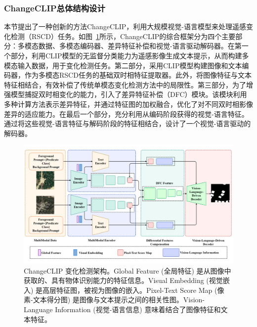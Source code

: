 \subsubsection{ChangeCLIP总体结构设计}
本节提出了一种创新的方法ChangeCLIP，利用大规模视觉-语言模型来处理遥感变化检测（RSCD）任务。如图~\ref{fig:changeclip3}所示，ChangeCLIP的综合框架分为四个主要部分：多模态数据、多模态编码器、差异特征补偿和视觉-语言驱动解码器。在第一个部分，利用CLIP模型的无监督分类能力为遥感影像生成文本提示，从而构建多模态输入数据，用于变化检测任务。第二部分，采用CLIP模型构建图像和文本编码器，作为多模态RSCD任务的基础双时相特征提取器。此外，将图像特征与文本特征相结合，有效补偿了传统单模态变化检测方法中的局限性。第三部分，为了增强模型捕捉双时相变化的能力，引入了差异特征补偿（DFC）模块。该模块利用多种计算方法表示差异特征，并通过特征图的加权融合，优化了对不同双时相影像差异的适应能力。在最后一个部分，充分利用从编码阶段获得的视觉-语言特征。通过将这些视觉-语言特征与解码阶段的特征相结合，设计了一个视觉-语言驱动的解码器。

\begin{figure}[!htbp]
  \centering
  \includegraphics[width=\textwidth]{paper_figures/基于AI基础模型微调的变化检测模型研究/ChangeCLIP/changeclip3.png}
  \caption{ChangeCLIP 变化检测架构。Global Feature (全局特征) 是从图像中获取的、具有物体识别能力的特征信息。Visual Embedding (视觉嵌入) 是高层特征图，被视为图像的嵌入。Pixel-Text Score Map (像素-文本得分图) 是图像与文本提示之间的相关性图。Vision-Language Information (视觉-语言信息) 意味着结合了图像特征和文本特征。}\label{fig:changeclip3}
\end{figure}

